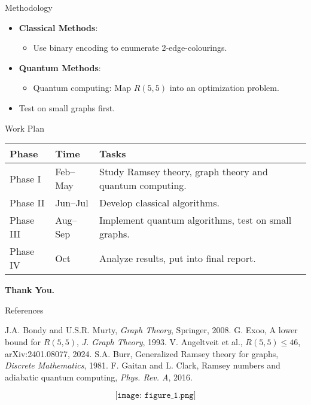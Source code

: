\documentclass{beamer}
\begin{document}
\begin{frame}{Methodology}
	\begin{itemize}
		\item \textbf{Classical Methods}:
		\begin{itemize}
			\item Use binary encoding to enumerate 2-edge-colourings.
		\end{itemize}
		\item \textbf{Quantum Methods}:
		\begin{itemize}
			\item Quantum computing: Map \( R(5,5) \) into an optimization problem.
		\end{itemize}
		\item Test on small graphs first.
	\end{itemize}
\end{frame}
\begin{frame}{Work Plan}
	\begin{table}[h]

		\begin{tabular}{|p{2cm}|p{2cm}|p{5cm}|}
			\hline
			\textbf{Phase} & \textbf{Time} & \textbf{Tasks} \\
			\hline
			Phase I & Feb--May & \small{Study Ramsey theory, graph theory and quantum computing.} \\
			\hline
			Phase II & Jun--Jul & Develop classical algorithms. \\
			\hline
			Phase III & Aug--Sep & Implement quantum algorithms, test on small graphs. \\
			\hline
			Phase IV & Oct & Analyze results, put into final report. \\
			\hline
		\end{tabular}
	\end{table}
\end{frame}
\begin{frame}
	\textbf{Thank You.}
\end{frame}
\begin{frame}{References}
	\begin{thebibliography}{9}
		J.A. Bondy and U.S.R. Murty, \textit{Graph Theory}, Springer, 2008.
		G. Exoo, A lower bound for \( R(5,5) \), \textit{J. Graph Theory}, 1993.
		V. Angeltveit et al., \( R(5,5) \leq 46 \), arXiv:2401.08077, 2024.
		S.A. Burr, Generalized Ramsey theory for graphs, \textit{Discrete Mathematics}, 1981.
		F. Gaitan and L. Clark, Ramsey numbers and adiabatic quantum computing, \textit{Phys. Rev. A}, 2016.
	\end{thebibliography}
\end{frame}
\begin{frame}
$$\texttt{[image: figure\_1.png]}$$
\end{frame}
\begin{frame}

\end{frame}
\end{document}
